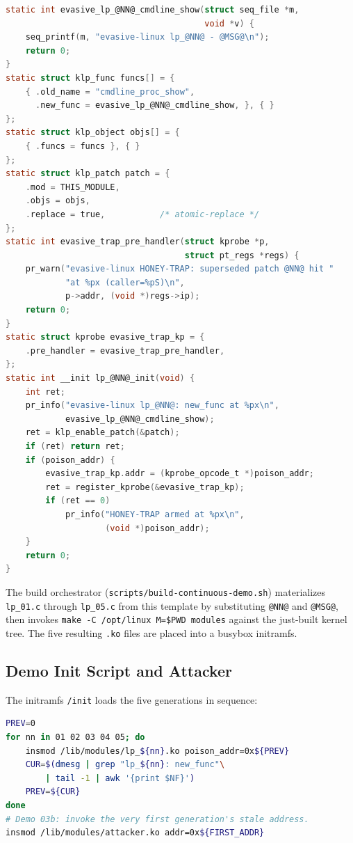 \documentclass[10pt,letterpaper]{article}
\begin{document}
\begin{lstlisting}[language=C]
static int evasive_lp_@NN@_cmdline_show(struct seq_file *m,
                                        void *v) {
    seq_printf(m, "evasive-linux lp_@NN@ - @MSG@\n");
    return 0;
}
static struct klp_func funcs[] = {
    { .old_name = "cmdline_proc_show",
      .new_func = evasive_lp_@NN@_cmdline_show, }, { }
};
static struct klp_object objs[] = {
    { .funcs = funcs }, { }
};
static struct klp_patch patch = {
    .mod = THIS_MODULE,
    .objs = objs,
    .replace = true,           /* atomic-replace */
};
static int evasive_trap_pre_handler(struct kprobe *p,
                                    struct pt_regs *regs) {
    pr_warn("evasive-linux HONEY-TRAP: superseded patch @NN@ hit "
            "at %px (caller=%pS)\n",
            p->addr, (void *)regs->ip);
    return 0;
}
static struct kprobe evasive_trap_kp = {
    .pre_handler = evasive_trap_pre_handler,
};
static int __init lp_@NN@_init(void) {
    int ret;
    pr_info("evasive-linux lp_@NN@: new_func at %px\n",
            evasive_lp_@NN@_cmdline_show);
    ret = klp_enable_patch(&patch);
    if (ret) return ret;
    if (poison_addr) {
        evasive_trap_kp.addr = (kprobe_opcode_t *)poison_addr;
        ret = register_kprobe(&evasive_trap_kp);
        if (ret == 0)
            pr_info("HONEY-TRAP armed at %px\n",
                    (void *)poison_addr);
    }
    return 0;
}
\end{lstlisting}

The build orchestrator
(\texttt{scripts/build-continuous-demo.sh}) materializes
\texttt{lp\_01.c} through \texttt{lp\_05.c} from this template by
substituting \texttt{@NN@} and \texttt{@MSG@}, then invokes
\texttt{make -C /opt/linux M=\$PWD modules} against the just-built
kernel tree. The five resulting \texttt{.ko} files are placed into a
busybox initramfs.

\subsection{Demo Init Script and Attacker}

The initramfs \texttt{/init} loads the five generations in sequence:

\begin{lstlisting}[language=bash]
PREV=0
for nn in 01 02 03 04 05; do
    insmod /lib/modules/lp_${nn}.ko poison_addr=0x${PREV}
    CUR=$(dmesg | grep "lp_${nn}: new_func"\
        | tail -1 | awk '{print $NF}')
    PREV=${CUR}
done
# Demo 03b: invoke the very first generation's stale address.
insmod /lib/modules/attacker.ko addr=0x${FIRST_ADDR}
\end{lstlisting}
\end{document}
